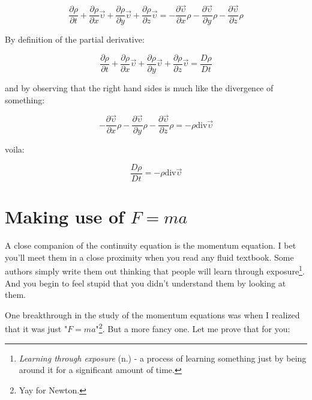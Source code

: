 \documentclass[12pt]{report}
\begin{document}
\begin{equation}
\frac{\partial \rho}{\partial t} + \frac{\partial \rho}{\partial x} \vec{\upsilon} + \frac{\partial \rho}{\partial y} \vec{\upsilon} + \frac{\partial \rho}{\partial z} \vec{\upsilon} =  - \frac{\partial \vec{\upsilon}}{\partial x} \rho - \frac{\partial \vec{\upsilon}}{\partial y} \rho - \frac{\partial \vec{\upsilon}}{\partial z} \rho
\end{equation}

By definition of the partial derivative:

\begin{equation}
\frac{\partial \rho}{\partial t} + \frac{\partial \rho}{\partial x} \vec{\upsilon} + \frac{\partial \rho}{\partial y} \vec{\upsilon} + \frac{\partial \rho}{\partial z} \vec{\upsilon} = \frac{D \rho}{D t}
\end{equation}

and by observing that the right hand sides is much like the divergence of something:

\begin{equation}
- \frac{\partial \vec{\upsilon}}{\partial x} \rho - \frac{\partial \vec{\upsilon}}{\partial y} \rho - \frac{\partial \vec{\upsilon}}{\partial z} \rho = - \rho \text{div} \vec{\upsilon}
\end{equation}

voila:

\begin{equation}
\frac{D \rho}{D t} = - \rho \text{div} \vec{\upsilon}
\end{equation}

\section{Making use of $F = ma$} \label{chap:momentum}

A close companion of the continuity equation is the momentum equation. I bet you'll meet them in a close proximity when you read any fluid textbook. Some authors simply write them out thinking that people will learn through exposure\footnote{\textit{Learning through exposure} (n.) - a process of learning something just by being around it for a significant amount of time.}. And you begin to feel stupid that you didn't understand them by looking at them.

One breakthrough in the study of the momentum equations was when I realized that it was just "$F=ma$"\footnote{Yay for Newton.}. But a more fancy one. Let me prove that for you:
\end{document}
